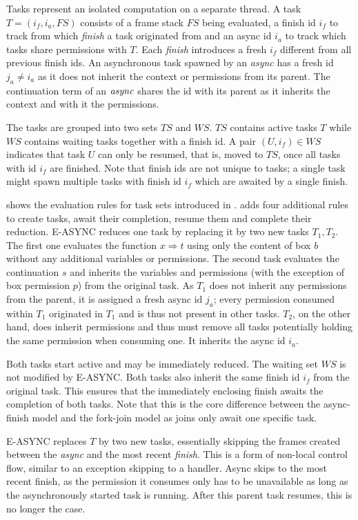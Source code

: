 Tasks represent an isolated computation on a separate thread. A task $T = (i_f, i_a, FS)$ consists of a frame stack $FS$ being evaluated, a finish id $i_f$ to track from which \textit{finish} a task originated from and an async id $i_a$ to track which tasks share permissions with $T$.
Each \textit{finish} introduces a fresh $i_f$ different from all previous finish ids.
An asynchronous task spawned by an \textit{async} has a fresh id $j_a \neq i_a$ as it does not inherit the context or permissions from its parent.
The continuation term of an $\mathop{\mathit{async}}$ shares the id with its parent as it inherits the context and with it the permissions.

The tasks are grouped into two sets $TS$ and $WS$. $TS$ contains active tasks $T$ while $WS$ contains waiting tasks together with a finish id. A pair $(U, i_f) \in WS$ indicates that task $U$ can only be resumed, that is, moved to $TS$, once all tasks with id $i_f$ are finished. Note that finish ids are not unique to tasks; a single task might spawn multiple tasks with finish id $i_f$ which are awaited by a single finish.

 shows the evaluation rules for task sets introduced in \plc. \plc adds four additional rules to create tasks, await their completion, resume them and complete their reduction. E-ASYNC reduces one task by replacing it by two new tasks $T_1, T_2$. The first one evaluates the function $x \Rightarrow t$ using only the content of box $b$ without any additional variables or permissions. The second task evaluates the continuation $s$ and inherits the variables and permissions (with the exception of box permission $p$) from the original task. As $T_1$ does not inherit any permissions from the parent, it is assigned a fresh async id $j_a$; every permission consumed within $T_1$ originated in $T_1$ and is thus not present in other tasks. $T_2$, on the other hand, does inherit permissions and thus must remove all tasks potentially holding the same permission when consuming one. It inherits the async id $i_a$.

Both tasks start active and may be immediately reduced. The waiting set $WS$ is not modified by E-ASYNC. Both tasks also inherit the same finish id $i_f$ from the original task. This ensures that the immediately enclosing finish awaits the completion of both tasks. Note that this is the core difference between the async-finish model and the fork-join model as joins only await one specific task.

E-ASYNC replaces $T$ by two new tasks, essentially skipping the frames created between the \textit{async} and the most recent \textit{finish}. This is a form of non-local control flow, similar to an exception skipping to a handler. Async skips to the most recent finish, as the permission it consumes only has to be unavailable as long as the asynchronously started task is running. After this parent task resumes, this is no longer the case.

